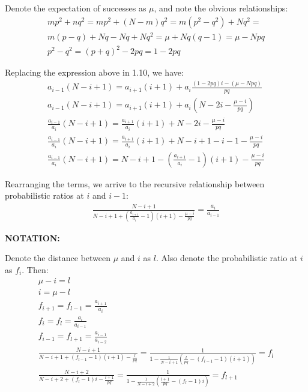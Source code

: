 \documentclass[11pt,draft]{article}
\begin{document}
Denote the expectation of successes as $\mu$, and note the obvious relationships:
\begin{align}
mp^2 + nq^2 = mp^2 + (N-m)q^2 = m(p^2 - q^2) + Nq^2 =\\
m(p- q) +Nq -Nq +Nq^2 = \mu + Nq(q-1) = \mu - Npq\\
p^2 - q^2 = (p+q)^2 - 2pq = 1 - 2pq
\end{align}

Replacing the expression above in 1.10, we have:
\begin{align}
a_{i-1}(N - i +1) = a_{i+1}(i+1) + a_i\frac{(1 -2pq)i - (\mu - Npq)}{pq} \\
a_{i-1}(N - i +1) = a_{i+1}(i+1) + a_i \left (N - 2i - \frac{\mu - i}{pq} \right ) \\
\frac{a_{i-1}}{a_{i}} (N - i +1) = \frac{ a_{i+1}}{a_i} (i+1) + N - 2i  - \frac{\mu - i}{pq} \\
\frac{a_{i-1}}{a_{i}} (N - i +1) = \frac{ a_{i+1}}{a_i} (i+1) + N - i +1 - i - 1 - \frac{\mu - i}{pq} \\
\frac{a_{i-1}}{a_{i}} (N - i +1) = N - i +1 - (\frac{ a_{i+1}}{a_i} - 1)(i+1) - \frac{\mu - i}{pq}
\end{align}

Rearranging the terms, we arrive to the recursive relationship between probabilistic ratios at $i$ and $i-1$:
\begin{align}
\frac{   N - i + 1}{ N - i +1  + (\frac{ a_{i+1}}{a_i} - 1)(i+1)   - \frac{\mu - i}{pq}   } =  \frac{a_{i}}{a_{i-1}} 
\end{align}

\textbf{NOTATION:}

Denote the distance between $\mu$ and $i$ as $l$.  Also denote the probabilistic ratio at $i$ as $f_i$.  Then:
\begin{align}
\mu - i = l\\
i = \mu -l \\
f_{i+1} = f_{l-1} = \frac{a_{i+1}}{a_{i}} \\
f_{i} =  f_{l} = \frac{a_{i}}{a_{i-1}} \\
f_{i-1} =  f_{l+1} = \frac{a_{i-1}}{a_{i-2}} \\
\frac{   N - i + 1}{ N - i + 1  + (f_{l-1} - 1)(i+1)  - \frac{l}{pq}   } =  \frac{  1 }{ 1  - \frac{1}{N- i + 1}\left (\frac{l}{pq} - (f_{l-1} - 1)(i+1) \right ) }  = f_{l}  \\
\frac{   N - i + 2}{ N - i + 2  + (f_l - 1)i  - \frac{l+1}{pq}   } =   \frac{  1 }{ 1  - \frac{1}{N- i + 2}\left (\frac{l+1}{pq} - (f_{l} - 1)i \right ) }  = f_{l+1} 
\end{align}
\end{document}
